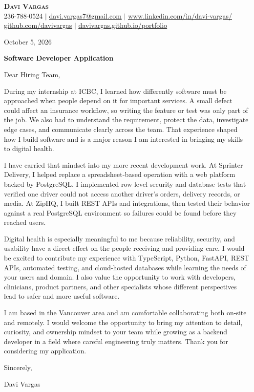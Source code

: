 \documentclass[letterpaper,11pt]{article}
\begin{document}
\begin{center}
    \textbf{\Huge \scshape Davi Vargas} \\ \vspace{1pt}
    \small 236-788-0524 $|$ \href{mailto:davi.vargas7@gmail.com}{\underline{davi.vargas7@gmail.com}} $|$
    \href{https://linkedin.com/in/davi-vargas}{\underline{www.linkedin.com/in/davi-vargas/}} \\[4pt]
    \href{https://github.com/davivargas}{\underline{github.com/davivargas}} $|$
    \href{https://davivargas.github.io/portfolio/}{\underline{davivargas.github.io/portfolio}}
\end{center}

October 5, 2026

\vspace{10pt}

\textbf{Software Developer Application}

\vspace{10pt}

Dear Hiring Team,

During my internship at ICBC, I learned how differently software must be approached when people depend on it for important services. A small defect could affect an insurance workflow, so writing the feature or test was only part of the job. We also had to understand the requirement, protect the data, investigate edge cases, and communicate clearly across the team. That experience shaped how I build software and is a major reason I am interested in bringing my skills to digital health.

I have carried that mindset into my more recent development work. At Sprinter Delivery, I helped replace a spreadsheet-based operation with a web platform backed by PostgreSQL. I implemented row-level security and database tests that verified one driver could not access another driver's orders, delivery records, or media. At ZipHQ, I built REST APIs and integrations, then tested their behavior against a real PostgreSQL environment so failures could be found before they reached users.

Digital health is especially meaningful to me because reliability, security, and usability have a direct effect on the people receiving and providing care. I would be excited to contribute my experience with TypeScript, Python, FastAPI, REST APIs, automated testing, and cloud-hosted databases while learning the needs of your users and domain. I also value the opportunity to work with developers, clinicians, product partners, and other specialists whose different perspectives lead to safer and more useful software.

I am based in the Vancouver area and am comfortable collaborating both on-site and remotely. I would welcome the opportunity to bring my attention to detail, curiosity, and ownership mindset to your team while growing as a backend developer in a field where careful engineering truly matters. Thank you for considering my application.

\vspace{6pt}

Sincerely,

\vspace{14pt}

Davi Vargas
\end{document}
